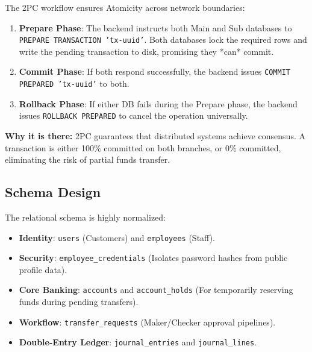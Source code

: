The 2PC workflow ensures Atomicity across network boundaries:
\begin{enumerate}
    \item \textbf{Prepare Phase}: The backend instructs both Main and Sub databases to \texttt{PREPARE TRANSACTION 'tx-uuid'}. Both databases lock the required rows and write the pending transaction to disk, promising they *can* commit.
    \item \textbf{Commit Phase}: If both respond successfully, the backend issues \texttt{COMMIT PREPARED 'tx-uuid'} to both.
    \item \textbf{Rollback Phase}: If either DB fails during the Prepare phase, the backend issues \texttt{ROLLBACK PREPARED} to cancel the operation universally.
\end{enumerate}

\textbf{Why it is there:} 2PC guarantees that distributed systems achieve consensus. A transaction is either 100\% committed on both branches, or 0\% committed, eliminating the risk of partial funds transfer.

\subsection{Schema Design}
The relational schema is highly normalized:
\begin{itemize}
    \item \textbf{Identity}: \texttt{users} (Customers) and \texttt{employees} (Staff).
    \item \textbf{Security}: \texttt{employee\_credentials} (Isolates password hashes from public profile data).
    \item \textbf{Core Banking}: \texttt{accounts} and \texttt{account\_holds} (For temporarily reserving funds during pending transfers).
    \item \textbf{Workflow}: \texttt{transfer\_requests} (Maker/Checker approval pipelines).
    \item \textbf{Double-Entry Ledger}: \texttt{journal\_entries} and \texttt{journal\_lines}.
\end{itemize}
